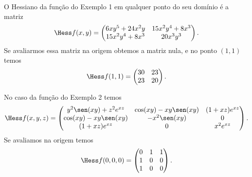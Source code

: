 \begin{example}{}{}
O Hessiano da função do Exemplo 1 em qualquer ponto do seu domínio é a matriz 
\[\Hess f(x,y)=
\begin{pmatrix}
   6xy^5 + 24x^2y &  15x^2y^4 + 8x^3\\
    15x^2y^4 + 8x^3 & 20x^3y^3
\end{pmatrix}.
\]
Se avaliarmos essa matriz na origem obtemos a matriz nula, e no ponto $(1,1)$ temos 
\[\Hess f(1,1)=
\begin{pmatrix}
   30 &  23 \\
23 & 20
\end{pmatrix}.
\]
\end{example}

\begin{example}{}{}
No caso da função do Exemplo 2 temos
\[
\Hess f(x,y,z)=
\begin{pmatrix}
y^2\sen(xy) + z^2e^{xz} & \cos (xy)-xy\sen(xy) & (1+xz)e^{xz} \\
\cos (xy)-xy\sen(xy)    & -x^2\sen(xy)         &  0           \\
(1+xz)e^{xz}            &  0                   &  x^2e^{xz}
\end{pmatrix}.
\]
Se avaliamos na origem temos
\[
\Hess f(0,0,0)=
\begin{pmatrix}
0 & 1 & 1 \\
1 & 0 & 0 \\
1 & 0 & 0
\end{pmatrix}.
\]

\end{example}


